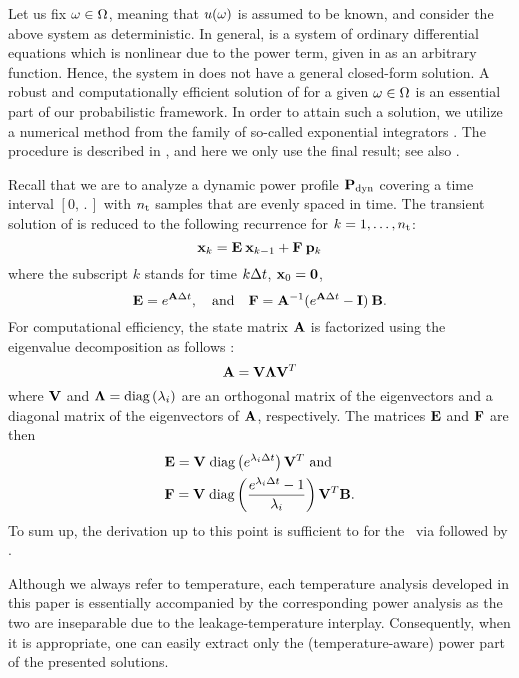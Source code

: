 Let us fix $\omega \in \Omega$, meaning that $u(\omega)$ is assumed to be known, and consider the above system as deterministic.
In general,  is a system of ordinary differential equations which is nonlinear due to the power term, given in  as an arbitrary function.
Hence, the system in  does not have a general closed-form solution.
A robust and computationally efficient solution of  for a given $\omega \in \Omega$ is an essential part of our probabilistic framework.
In order to attain such a solution, we utilize a numerical method from the family of so-called exponential integrators \cite{hochbruck2010}.
The procedure is described in , and here we only use the final result; see also \cite{ukhov2012}.

Recall that we are to analyze a dynamic power profile $\mathbf{P}_{\text{dyn}}$ covering a time interval $[0, \period]$ with ${n_\text{t}}$ samples that are evenly spaced in time.
The transient solution of  is reduced to the following recurrence for $k = 1, \dots, {n_\text{t}}$:
\begin{equation} \elab{recurrence}
  \vX_k = \mE \: \vX_{k - 1} + \mF \: \vP_k
\end{equation}
where the subscript $k$ stands for time $k \Delta t$, $\mathbf{x}_0 = \mathbf{0}$,
\[
  \mathbf{E} = e^{\mathbf{A} \Delta t}, \hspace{1em} \text{and} \hspace{1em} \mathbf{F} = \mathbf{A}^{-1} (e^{\mathbf{A} \Delta t} - \mathbf{I}) \: \mathbf{B}.
\]
For computational efficiency, the state matrix $\mathbf{A}$ is factorized using the eigenvalue decomposition as follows \cite{press2007}:
\begin{equation} \elab{eigenvalue-decomposition}
  \mA = \mV \mL \mV^T
\end{equation}
where $\mathbf{V}$ and $\mathbf{\Lambda} = \text{diag}\left( \lambda_i \right)$ are an orthogonal matrix of the eigenvectors and a diagonal matrix of the eigenvectors of $\mathbf{A}$, respectively.
The matrices $\mathbf{E}$ and $\mathbf{F}$ are then
\begin{align*}
  & \mathbf{E} = \mathbf{V} \; \text{diag}\left( e^{\lambda_i \Delta t} \right) \mathbf{V}^T \text{ and} \\
  & \mathbf{F} = \mathbf{V} \; \text{diag}\left(  \frac{e^{\lambda_i \Delta t} - 1}{\lambda_i}  \right) \mathbf{V}^T \mathbf{B}.
\end{align*}
To sum up, the derivation up to this point is sufficient to for the \tta\ via  followed by .
\begin{remark}
Although we always refer to temperature, each temperature analysis developed in this paper is essentially accompanied by the corresponding power analysis as the two are inseparable due to the leakage-temperature interplay.
Consequently, when it is appropriate, one can easily extract only the (temperature-aware) power part of the presented solutions.
\end{remark}

